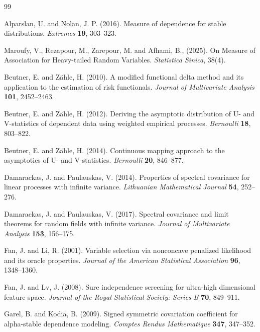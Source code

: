 \documentclass[11pt]{article}
\theoremstyle{definition}
\begin{document}
\begin{thebibliography}{99}

Alparslan, U. and Nolan, J. P. (2016). Measure of dependence for stable distributions. \emph{Extremes} \textbf{19}, 303--323.

Maroufy, V., Rezapour, M., Zarepour, M. and Afhami, B., (2025). On Measure of Association for Heavy-tailed Random Variables. \emph{Statistica Sinica}, 38(4).


Beutner, E. and Z\"ahle, H. (2010). A modified functional delta method and its application to the estimation of risk functionals. \emph{Journal of Multivariate Analysis} \textbf{101}, 2452--2463.

Beutner, E. and Z\"ahle, H. (2012). Deriving the asymptotic distribution of U- and V-statistics of dependent data using weighted empirical processes. \emph{Bernoulli} \textbf{18}, 803--822.

Beutner, E. and Z\"ahle, H. (2014). Continuous mapping approach to the asymptotics of U- and V-statistics. \emph{Bernoulli} \textbf{20}, 846--877.

Damarackas, J. and Paulauskas, V. (2014). Properties of spectral covariance for linear processes with infinite variance. \emph{Lithuanian Mathematical Journal} \textbf{54}, 252--276.

Damarackas, J. and Paulauskas, V. (2017). Spectral covariance and limit theorems for random fields with infinite variance. \emph{Journal of Multivariate Analysis} \textbf{153}, 156--175.

Fan, J. and Li, R. (2001). Variable selection via nonconcave penalized likelihood and its oracle properties. \emph{Journal of the American Statistical Association} \textbf{96}, 1348--1360.

Fan, J. and Lv, J. (2008). Sure independence screening for ultra-high dimensional feature space. \emph{Journal of the Royal Statistical Society: Series B} \textbf{70}, 849--911.

Garel, B. and Kodia, B. (2009). Signed symmetric covariation coefficient for alpha-stable dependence modeling. \emph{Comptes Rendus Mathematique} \textbf{347}, 347--352.


\end{thebibliography}
\end{document}
